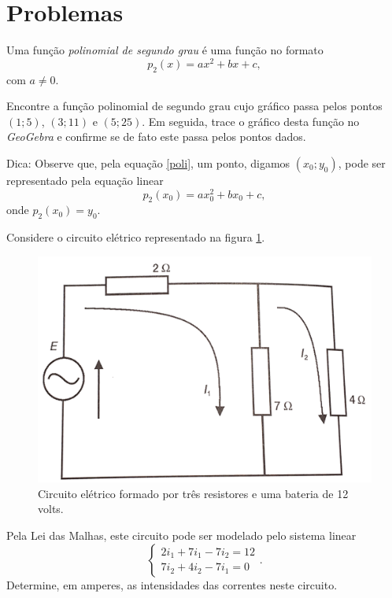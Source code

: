\section{Problemas}


\begin{ex}
Uma função \emph{polinomial de segundo grau} é uma função no formato
\begin{equation}\label{poli}
p_2(x)=ax^2+bx+c,
\end{equation}
com $a\neq 0$. 


Encontre a função polinomial de segundo grau cujo gráfico passa pelos pontos $(1;5)$, $(3;11)$ e $(5;25)$. Em seguida, trace o gráfico desta função no \emph{GeoGebra} e confirme se de fato este passa pelos pontos dados.


Dica: Observe que, pela equação \ref{poli}, um ponto, digamos $(x_0;y_0)$, pode ser representado pela equação linear
$$p_2(x_0)=ax_0^2+bx_0+c,$$
onde $p_2(x_0)=y_0$.
\end{ex}
\begin{ex}
Considere o circuito elétrico%
 representado na figura \ref{circuitoburian}.
\begin{figure}[htb]
\caption{Circuito elétrico formado por três resistores e uma bateria de 12 volts.}
\label{circuitoburian}
\begin{center}
\includegraphics[width=0.5\linewidth]{fig/circuitoburian}
\end{center}
\end{figure}
Pela Lei das Malhas, este circuito pode ser modelado pelo sistema linear
$$\begin{cases}
2i_1+7i_1-7i_2=12\\
7i_2+4i_2-7i_1=0
\end{cases}.$$
Determine, em amperes, as intensidades das correntes neste circuito.
\end{ex}


